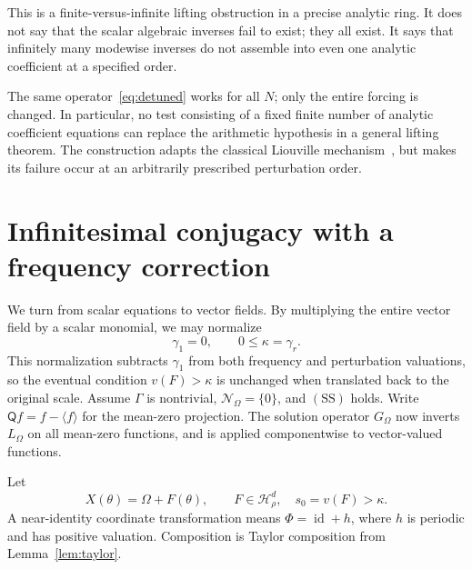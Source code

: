 \documentclass[11pt,letterpaper]{article}
\theoremstyle{definition}
\theoremstyle{remark}
\newcommand{\HH}{\mathcal H}
\newcommand{\id}{\operatorname{id}}
\newcommand{\mean}[1]{\langle #1\rangle}
\newcommand{\Lom}{L_{\Omega}}
\newcommand{\Gom}{G_{\Omega}}
\newcommand{\res}{\mathcal N_{\Omega}}
\newcommand{\SDcond}{\mathrm{SS}}
\numberwithin{equation}{section}
\begin{document}
This is a finite-versus-infinite lifting obstruction in a precise analytic
ring.  It does not say that the scalar algebraic inverses fail to exist;
they all exist.  It says that infinitely many modewise inverses do not
assemble into even one analytic coefficient at a specified order.

The same operator~\eqref{eq:detuned} works for all $N$; only the entire
forcing is changed.  In particular, no test consisting of a fixed finite
number of analytic coefficient equations can replace the arithmetic
hypothesis in a general lifting theorem.  The construction adapts the
classical Liouville mechanism~\cite{kamen}, but makes its failure occur at
an arbitrarily prescribed perturbation order.

\section{Infinitesimal conjugacy with a frequency correction}
\label{sec:nonlinear}

We turn from scalar equations to vector fields.  By multiplying the entire
vector field by a scalar monomial, we may normalize
\begin{equation}\label{eq:normalized}
 \gamma_1=0,\qquad 0\le\kappa=\gamma_r.
\end{equation}
This normalization subtracts $\gamma_1$ from both frequency and perturbation
valuations, so the eventual condition $v(F)>\kappa$ is unchanged when translated
back to the original scale.
Assume $\Gamma$ is nontrivial, $\res=\{0\}$, and $(\SDcond)$ holds.
Write $\mathsf Q f=f-\mean f$ for the mean-zero projection.  The solution
operator $\Gom$ now inverts $\Lom$ on all mean-zero functions, and is applied
componentwise to vector-valued functions.

Let
\begin{equation}\label{eq:vectorfield}
 X(\theta)=\Omega+F(\theta),\qquad F\in\HH_\rho^d,
 \quad s_0=v(F)>\kappa.
\end{equation}
A near-identity coordinate transformation means
$\Phi=\id+h$, where $h$ is periodic and has positive valuation.  Composition
is Taylor composition from Lemma~\ref{lem:taylor}.
\end{document}
